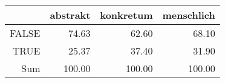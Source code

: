 \begin{tabular}{rrrr}
  \hline
 & abstrakt & konkretum & menschlich \\ 
  \hline
FALSE & 74.63 & 62.60 & 68.10 \\ 
  TRUE & 25.37 & 37.40 & 31.90 \\ 
  Sum & 100.00 & 100.00 & 100.00 \\ 
   \hline
\end{tabular}
